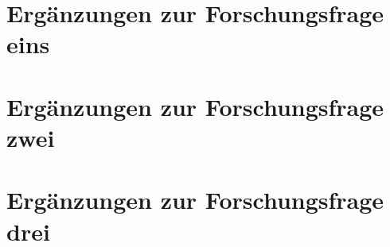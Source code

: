 \chapter{Ergänzungen zur Forschungsfrage eins} \label{appendixFF1}


\chapter{Ergänzungen zur Forschungsfrage zwei} \label{appendixFF2}



\chapter{Ergänzungen zur Forschungsfrage drei} \label{appendixFF3}



